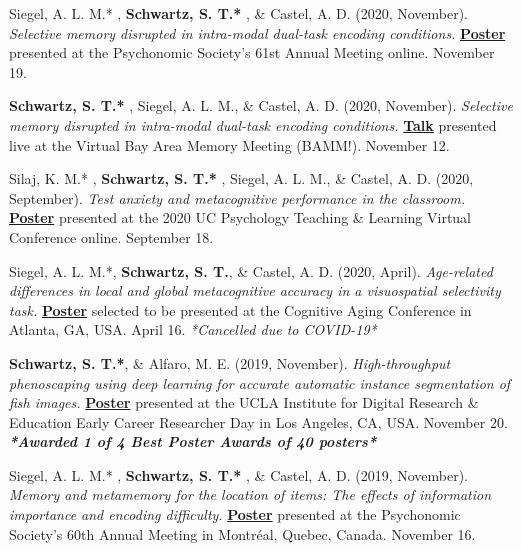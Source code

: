 \pubspace

Siegel, A. L. M.* \dag, \textbf{Schwartz, S. T.* \dag}, \& Castel, A. D. (2020, November). \textit{Selective memory disrupted in intra-modal dual-task encoding conditions.} \textbf{\underline{Poster}} presented at the Psychonomic Society's 61st Annual Meeting online. November 19.

\pubspace

\textbf{Schwartz, S. T.* \dag}, Siegel, A. L. M.\dag, \& Castel, A. D. (2020, November). \textit{Selective memory disrupted in intra-modal dual-task encoding conditions.} \textbf{\underline{Talk}} presented live at the Virtual Bay Area Memory Meeting (BAMM!). November 12.

\pubspace

Silaj, K. M.* \dag, \textbf{Schwartz, S. T.* \dag}, Siegel, A. L. M., \& Castel, A. D. (2020, September). \textit{Test anxiety and metacognitive performance in the classroom.} \textbf{\underline{Poster}} presented at the 2020 UC Psychology Teaching \& Learning Virtual Conference online. September 18.

\pubspace

Siegel, A. L. M.*, \textbf{Schwartz, S. T.}, \& Castel, A. D. (2020, April). \textit{Age-related differences in local and global metacognitive accuracy in a visuospatial selectivity task.} \textbf{\underline{Poster}} selected to be presented at the Cognitive Aging Conference in Atlanta, GA, USA. April 16. \textit{*Cancelled due to COVID-19*}

\pubspace

\textbf{Schwartz, S. T.*}, \& Alfaro, M. E. (2019, November). \textit{High-throughput phenoscaping using deep learning for accurate automatic instance segmentation of fish images.} \textbf{\underline{Poster}} presented at the UCLA Institute for Digital Research \& Education Early Career Researcher Day in Los Angeles, CA, USA. November 20. \textbf{\textit{*Awarded 1 of 4 Best Poster Awards of 40 posters*}}

\pubspace

Siegel, A. L. M.* \dag, \textbf{Schwartz, S. T.* \dag}, \& Castel, A. D. (2019, November). \textit{Memory and metamemory for the location of items: The effects of information importance and encoding difficulty.} \textbf{\underline{Poster}} presented at the Psychonomic Society's 60th Annual Meeting in Montr\'eal, Quebec, Canada. November 16.

\pubspace

